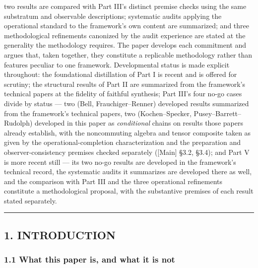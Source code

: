 \documentclass[
]{article}
\begin{document}
two results are compared with Part III's distinct premise checks using
the same substratum and observable descriptions; systematic audits
applying the operational standard to the framework's own content are
summarized; and three methodological refinements canonized by the audit
experience are stated at the generality the methodology requires. The
paper develops each commitment and argues that, taken together, they
constitute a replicable methodology rather than features peculiar to one
framework. Developmental status is made explicit throughout: the
foundational distillation of Part I is recent and is offered for
scrutiny; the structural results of Part II are summarized from the
framework's technical papers at the fidelity of faithful synthesis; Part
III's four no-go cases divide by status --- two (Bell,
Frauchiger--Renner) developed results summarized from the framework's
technical papers, two (Kochen--Specker, Pusey--Barrett--Rudolph)
developed in this paper as \emph{conditional} chains on results those
papers already establish, with the noncommuting algebra and tensor
composite taken as given by the operational-completion characterization
and the preparation and observer-consistency premises checked separately
({[}Main{]} §3.2, §3.4); and Part V is more recent still --- its two
no-go results are developed in the framework's technical record, the
systematic audits it summarizes are developed there as well, and the
comparison with Part III and the three operational refinements
constitute a methodological proposal, with the substantive premises of
each result stated separately.

\begin{center}\rule{0.5\linewidth}{0.5pt}\end{center}

\hypertarget{introduction}{%
\subsection{1. INTRODUCTION}\label{introduction}}

\hypertarget{what-this-paper-is-and-what-it-is-not}{%
\subsubsection{1.1 What this paper is, and what it is
not}\label{what-this-paper-is-and-what-it-is-not}}
\end{document}
